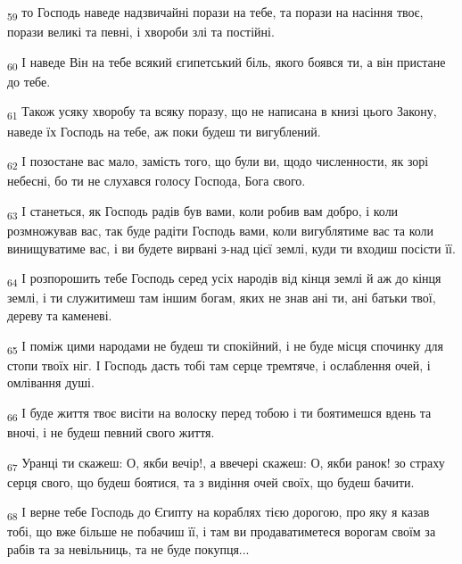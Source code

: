 \begin{tcolorbox}
\textsubscript{59} то Господь наведе надзвичайні порази на тебе, та порази на насіння твоє, порази великі та певні, і хвороби злі та постійні.
\end{tcolorbox}
\begin{tcolorbox}
\textsubscript{60} І наведе Він на тебе всякий єгипетський біль, якого боявся ти, а він пристане до тебе.
\end{tcolorbox}
\begin{tcolorbox}
\textsubscript{61} Також усяку хворобу та всяку поразу, що не написана в книзі цього Закону, наведе їх Господь на тебе, аж поки будеш ти вигублений.
\end{tcolorbox}
\begin{tcolorbox}
\textsubscript{62} І позостане вас мало, замість того, що були ви, щодо численности, як зорі небесні, бо ти не слухався голосу Господа, Бога свого.
\end{tcolorbox}
\begin{tcolorbox}
\textsubscript{63} І станеться, як Господь радів був вами, коли робив вам добро, і коли розмножував вас, так буде радіти Господь вами, коли вигублятиме вас та коли винищуватиме вас, і ви будете вирвані з-над цієї землі, куди ти входиш посісти її.
\end{tcolorbox}
\begin{tcolorbox}
\textsubscript{64} І розпорошить тебе Господь серед усіх народів від кінця землі й аж до кінця землі, і ти служитимеш там іншим богам, яких не знав ані ти, ані батьки твої, дереву та каменеві.
\end{tcolorbox}
\begin{tcolorbox}
\textsubscript{65} І поміж цими народами не будеш ти спокійний, і не буде місця спочинку для стопи твоїх ніг. І Господь дасть тобі там серце тремтяче, і ослаблення очей, і омлівання душі.
\end{tcolorbox}
\begin{tcolorbox}
\textsubscript{66} І буде життя твоє висіти на волоску перед тобою і ти боятимешся вдень та вночі, і не будеш певний свого життя.
\end{tcolorbox}
\begin{tcolorbox}
\textsubscript{67} Уранці ти скажеш: О, якби вечір!, а ввечері скажеш: О, якби ранок! зо страху серця свого, що будеш боятися, та з видіння очей своїх, що будеш бачити.
\end{tcolorbox}
\begin{tcolorbox}
\textsubscript{68} І верне тебе Господь до Єгипту на кораблях тією дорогою, про яку я казав тобі, що вже більше не побачиш її, і там ви продаватиметеся ворогам своїм за рабів та за невільниць, та не буде покупця...
\end{tcolorbox}

